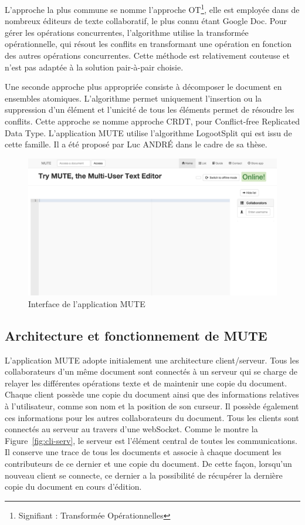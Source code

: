 \documentclass{tnreport}
\begin{document}
L'approche la plus commune se nomme l'approche OT\footnote{Signifiant : Transformée Opérationnelles}, elle est employée dans de nombreux éditeurs de texte collaboratif, le plus connu étant Google Doc. Pour gérer les opérations concurrentes, l'algorithme utilise la transformée opérationnelle, qui résout les conflits en transformant une opération en fonction des autres opérations concurrentes. Cette méthode est relativement couteuse et n'est pas adaptée à la solution pair-à-pair choisie. 

Une seconde approche plus appropriée consiste à décomposer le document en ensembles atomiques. L'algorithme permet uniquement l'insertion ou la suppression d'un élément et l'unicité de tous les éléments permet de résoudre les conflits. Cette approche se nomme approche CRDT, pour Conflict-free Replicated Data Type. L’application MUTE utilise l'algorithme LogootSplit qui est issu de cette famille. Il a été proposé par Luc ANDRÉ dans le cadre de sa thèse.

\begin{figure}[!h]
  \centering
  \includegraphics[width=14cm]{figures/screenshot-mute}
  \caption{Interface de l'application MUTE}
  \label{fig:screen-mute}
\end{figure}


\subsection{Architecture et fonctionnement de MUTE}

L'application MUTE adopte initialement une architecture client/serveur. Tous les collaborateurs d'un même document sont connectés à un serveur qui se charge de relayer les différentes opérations texte et de maintenir une copie du document. Chaque client possède une copie du document ainsi que des informations relatives à l'utilisateur, comme son nom et la position de son curseur. Il possède également ces informations pour les autres collaborateurs du document. Tous les clients sont connectés au serveur au travers d'une webSocket. Comme le montre la Figure~\ref{fig:cli-serv}, le serveur est l'élément central de toutes les communications. Il conserve une trace de tous les documents et associe à chaque document les contributeurs de ce dernier et une copie du document. De cette façon, lorsqu'un nouveau client se connecte, ce dernier a la possibilité de récupérer la dernière copie du document en cours d'édition. 
\end{document}
